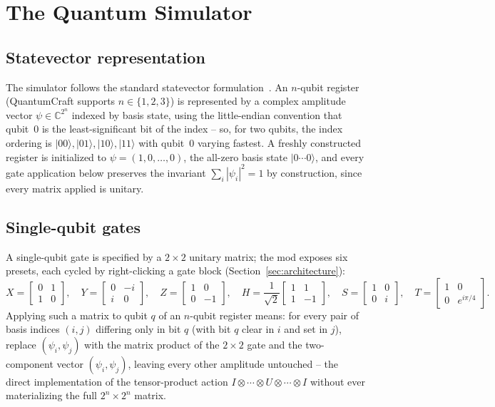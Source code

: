 \section{The Quantum Simulator}
\label{sec:quantum-simulator}

\subsection{Statevector representation}

The simulator follows the standard statevector formulation~\cite{nielsenchuang2010}. An
$n$-qubit register (QuantumCraft supports $n \in \{1,2,3\}$) is represented by a complex
amplitude vector $\psi \in \mathbb{C}^{2^n}$ indexed by basis state, using the little-endian
convention that qubit~0 is the least-significant bit of the index -- so, for two qubits, the
index ordering is $|00\rangle, |01\rangle, |10\rangle, |11\rangle$ with qubit~0 varying
fastest. A freshly constructed register is initialized to $\psi = (1, 0, \ldots, 0)$, the
all-zero basis state $|0\cdots0\rangle$, and every gate application below preserves the
invariant $\sum_i |\psi_i|^2 = 1$ by construction, since every matrix applied is unitary.

\subsection{Single-qubit gates}

A single-qubit gate is specified by a $2\times2$ unitary matrix; the mod exposes six presets,
each cycled by right-clicking a gate block (Section~\ref{sec:architecture}):
\begin{equation}
X = \begin{bmatrix} 0&1\\1&0 \end{bmatrix}, \quad
Y = \begin{bmatrix} 0&-i\\i&0 \end{bmatrix}, \quad
Z = \begin{bmatrix} 1&0\\0&-1 \end{bmatrix}, \quad
H = \frac{1}{\sqrt2}\begin{bmatrix} 1&1\\1&-1 \end{bmatrix}, \quad
S = \begin{bmatrix} 1&0\\0&i \end{bmatrix}, \quad
T = \begin{bmatrix} 1&0\\0&e^{i\pi/4} \end{bmatrix}.
\end{equation}
Applying such a matrix to qubit $q$ of an $n$-qubit register means: for every pair of basis
indices $(i, j)$ differing only in bit $q$ (with bit $q$ clear in $i$ and set in $j$), replace
$(\psi_i, \psi_j)$ with the matrix product of the $2\times2$ gate and the two-component vector
$(\psi_i, \psi_j)$, leaving every other amplitude untouched -- the direct implementation of
the tensor-product action $I \otimes \cdots \otimes U \otimes \cdots \otimes I$ without ever
materializing the full $2^n \times 2^n$ matrix.

